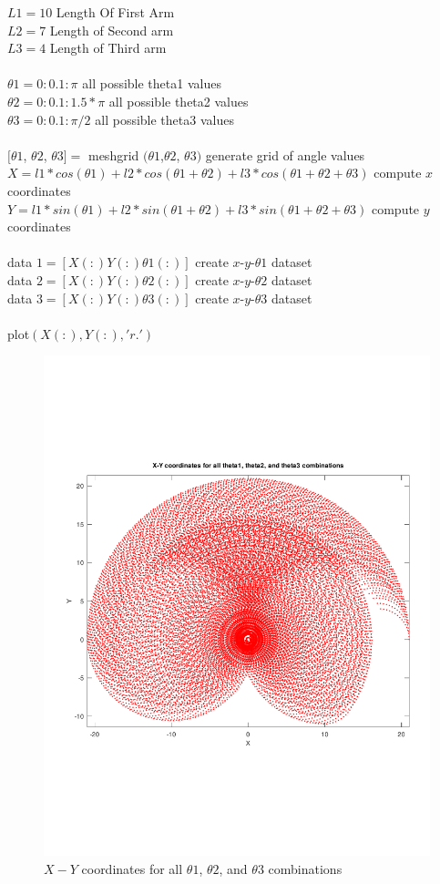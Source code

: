 \documentclass[12pt]{article}
\begin{document}
$L1 = 10 $  Length Of First Arm \\
$L2 = 7 $  Length of Second arm \\
$L3 = 4 $  Length of Third arm \\
\\
$\theta 1 = 0:0.1:\pi$  all possible theta1 values \\
$\theta 2 = 0:0.1:1.5*\pi$  all possible theta2 values \\
$\theta 3 = 0:0.1:\pi/2$  all possible theta3 values \\
\\
$[ \theta{1} $, $ \theta{2} $, $ \theta{3} ] = $ meshgrid $ (\theta1 $,$ \theta2 $, $ \theta3) $  generate grid of angle values
\\
$X = l1 * cos(\theta 1) + l2 * cos(\theta 1 + \theta 2) + l3 * cos(\theta 1 + \theta 2 + \theta 3) $  compute $x$ coordinates \\
$Y = l1 * sin(\theta 1) + l2 * sin(\theta 1 + \theta 2) + l3 * sin(\theta 1 + \theta 2 + \theta 3) $  compute $y$ coordinates \\
\\
data $1 = [X(:) Y(:) \theta 1(:)] $ create $x$-$y$-$\theta1$  dataset \\
data $2 = [X(:) Y(:) \theta 2(:)] $ create $x$-$y$-$\theta2$  dataset \\
data $3 = [X(:) Y(:) \theta 3(:)] $ create $x$-$y$-$\theta3$  dataset \\
\\
plot$(X(:),Y(:),'r.')$

\begin{figure}
\caption{$X - Y$ coordinates for all $\theta 1$, $\theta 2$, and $\theta 3$ combinations}
\centering
\includegraphics[width=\textwidth]{Inverse Kinematics.pdf} 
\end{figure}

 
\end{document}
